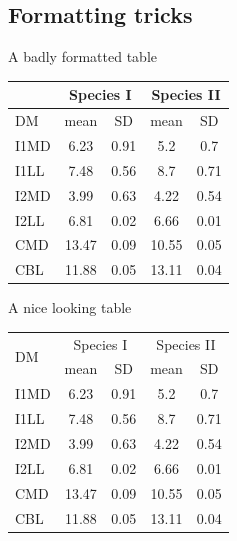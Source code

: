 \documentclass[10pt,times]{beamer}
\begin{document}
\subsection{Formatting tricks}

\begin{frame}[fragile]{A badly formatted table}
\begin{exampletwouptinyfifty}
\begin{tabular}{|l|c|c|c|c|}
\hline 
& \multicolumn{2}{c}{Species I} &
	 \multicolumn{2}{c|}{Species II} \\ 
\hline
DM  & mean & SD  & mean & SD  \\ 
\hline 
\hline
I1MD & 6.23 & 0.91 & 5.2  & 0.7  \\
\hline 
I1LL & 7.48 & 0.56 & 8.7  & 0.71 \\
\hline 
I2MD & 3.99 & 0.63 & 4.22 & 0.54 \\
\hline 
I2LL & 6.81 & 0.02 & 6.66 & 0.01 \\
\hline 
CMD & 13.47 & 0.09 & 10.55 & 0.05 \\
\hline 
CBL & 11.88 & 0.05 & 13.11 & 0.04\\ 
\hline 
\end{tabular}
\end{exampletwouptinyfifty}
\end{frame}

\begin{frame}[fragile]{A nice looking table}
\begin{exampletwouptinyfifty}
\begin{tabular}{l c c c c}
\hline 
\multirow{2}{*}{DM}
 & \multicolumn{2}{c}{Species I}
 & \multicolumn{2}{c}{Species II} \\ 
\cline{2-5}
  & mean & SD  & mean & SD  \\ 
\hline
I1MD & 6.23 & 0.91 & 5.2  & 0.7  \\

I1LL & 7.48 & 0.56 & 8.7  & 0.71 \\

I2MD & 3.99 & 0.63 & 4.22 & 0.54 \\

I2LL & 6.81 & 0.02 & 6.66 & 0.01 \\

CMD & 13.47 & 0.09 & 10.55 & 0.05 \\

CBL & 11.88 & 0.05 & 13.11 & 0.04\\ 
\hline 
\end{tabular}
\end{exampletwouptinyfifty}
\end{frame}
\end{document}
